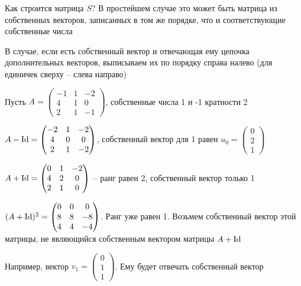 \documentclass[12pt]{article}
\begin{document}
\begin{nota}{Как строится матрица $S$?}
    В простейшем случае это может быть матрица из собственных векторов, записанных в том же порядке, что и соответствующие собственные числа 

    В случае, если есть собственный вектор и отвечающая ему цепочка дополнительных векторов, выписываем их по порядку справа налево (для единичек сверху -- слева направо)
\end{nota}

\begin{Example}{}
    Пусть $A = \begin{pmatrix}
        -1 & 1 & -2 \\
        4 & 1 & 0 \\
        2 & 1 & -1
    \end{pmatrix}$, собственные числа 1 и -1 кратности 2

    $A - \operatorname{Id} = \begin{pmatrix}
        -2 & 1 & -2 \\
        4 & 0 & 0 \\
        2 & 1 & -2
    \end{pmatrix}$, собственный вектор для 1 равен $u_0 = \begin{pmatrix}
        0 \\ 
        2 \\
        1
    \end{pmatrix}$

    $A + \operatorname{Id} = \begin{pmatrix}
        0 & 1 & -2 \\
        4 & 2 & 0 \\
        2 & 1 & 0
    \end{pmatrix}$ -- ранг равен 2, собственный вектор только 1

    $(A + \operatorname{Id})^2 = \begin{pmatrix}
        0 & 0 & 0 \\
        8 & 8 & -8 \\
        4 & 4 & -4
    \end{pmatrix}$. Ранг уже равен 1. Возьмем собственный вектор этой матрицы, не являющийся собственным вектором матрицы $A + \operatorname{Id}$

    Например, вектор $v_1 = \begin{pmatrix}
        0 \\
        1 \\
        1
    \end{pmatrix}$. Ему будет отвечать собственный вектор 
    

\end{Example}
\end{document}

